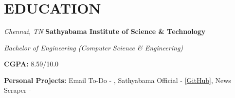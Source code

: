 \section{EDUCATION}
\begin{twocolentry}{
    \textit{Chennai, TN}}
    \textbf{Sathyabama Institute of Science \& Technology}

    \textit{Bachelor of Engineering \small{(Computer Science \& Engineering)}}
\end{twocolentry}
    
\vspace{0.10 cm}





\begin{onecolentry}
    \begin{highlights}
        \item \textbf{CGPA:} 8.59/10.0 
        \item \textbf{Personal Projects:} 
            {Email To-Do - {}},  
            {Sathyabama Official - { {[\underline {GitHub}]}}}, 
            {News Scraper - {}}
        \end{highlights}
\end{onecolentry}
